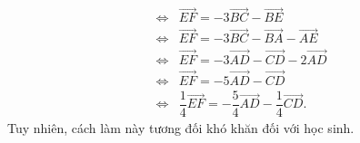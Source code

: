 \begin{bt}
{\begin{enumerate}
\begin{eqnarray*}
	& \Leftrightarrow& \overrightarrow{E F}=-3 \overrightarrow{B C}-\overrightarrow{B E} \\
	& \Leftrightarrow& \overrightarrow{E F}=-3 \overrightarrow{B C}-\overrightarrow{B A}-\overrightarrow{A E} \\
	& \Leftrightarrow& \overrightarrow{E F}=-3 \overrightarrow{A D}-\overrightarrow{C D}-2 \overrightarrow{A D} \\
	& \Leftrightarrow& \overrightarrow{E F}=-5 \overrightarrow{A D}-\overrightarrow{C D} \\
	& \Leftrightarrow& \dfrac{1}{4} \overrightarrow{E F}=-\dfrac{5}{4} \overrightarrow{A D}-\dfrac{1}{4} \overrightarrow{C D}.
\end{eqnarray*}
	Tuy nhiên, cách làm này tương đối khó khăn đối với học sinh.
\end{enumerate}
}
\end{bt}

